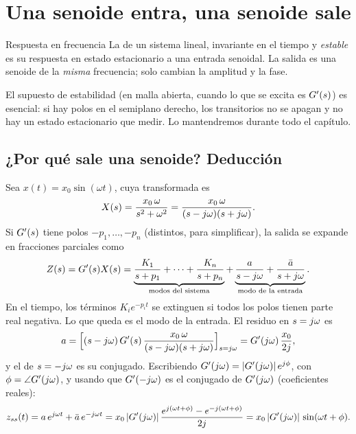 \section{Una senoide entra, una senoide sale}
\label{sec:rf-senoide}

\begin{definicion}[label=def:rf-respuesta]{Respuesta en frecuencia}
La  de un sistema lineal, invariante en el tiempo y \emph{estable} es su respuesta en estado estacionario a una entrada senoidal. La salida es una senoide de la \emph{misma} frecuencia; solo cambian la amplitud y la fase.
\end{definicion}

El supuesto de estabilidad (en malla abierta, cuando lo que se excita es $G'(s)$) es esencial: si hay polos en el semiplano derecho, los transitorios no se apagan y no hay un estado estacionario que medir. Lo mantendremos durante todo el capítulo.

\subsection{¿Por qué sale una senoide? Deducción}
\label{sec:rf-deduccion}

Sea $x(t)=x_0\sin(\omega t)$, cuya transformada es
\begin{equation}
  X(s)=\frac{x_0\,\omega}{s^2+\omega^2}=\frac{x_0\,\omega}{(s-j\omega)(s+j\omega)}.
\end{equation}
Si $G'(s)$ tiene polos $-p_1,\dots,-p_n$ (distintos, para simplificar), la salida se expande en fracciones parciales como
\begin{equation}
  Z(s)=G'(s)X(s)=\underbrace{\frac{K_1}{s+p_1}+\cdots+\frac{K_n}{s+p_n}}_{\text{modos del sistema}}
  +\underbrace{\frac{a}{s-j\omega}+\frac{\bar a}{s+j\omega}}_{\text{modo de la entrada}}.
\end{equation}
En el tiempo, los términos $K_ie^{-p_it}$ se extinguen si todos los polos tienen parte real negativa. Lo que queda es el modo de la entrada. El residuo en $s=j\omega$ es
\begin{equation}
  a=\Big[(s-j\omega)\,G'(s)\,\frac{x_0\,\omega}{(s-j\omega)(s+j\omega)}\Big]_{s=j\omega}
  =G'(j\omega)\,\frac{x_0}{2j},
\end{equation}
y el de $s=-j\omega$ es su conjugado. Escribiendo $G'(j\omega)=|G'(j\omega)|\,e^{j\phi}$, con $\phi=\angle G'(j\omega)$, y usando que $G'(-j\omega)$ es el conjugado de $G'(j\omega)$ (coeficientes reales):
\begin{equation}
  z_{ss}(t)=a\,e^{j\omega t}+\bar a\,e^{-j\omega t}
  =x_0\,|G'(j\omega)|\,\frac{e^{j(\omega t+\phi)}-e^{-j(\omega t+\phi)}}{2j}
  =x_0\,|G'(j\omega)|\,\sin(\omega t+\phi).
  \label{eq:rf-zss}
\end{equation}

